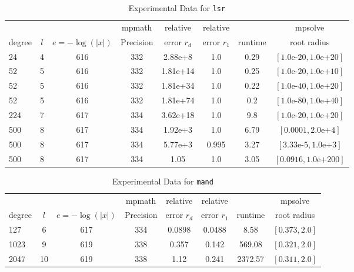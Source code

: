 \documentclass[sigconf]{acmart}
\begin{document}
\begin{table}[t]
\caption{Experimental Data for \texttt{lsr}} %
\label{tab:lsr}
\vskip -0.15in
\begin{center}
\begin{small}
\begin{sc}
\begin{tabular}{lccccccc}
\toprule
&  &  & mpmath & relative  & relative &  & mpsolve \\
degree  & $l$& $e=-\log(|x|)$& Precision &error $r_d$       & error $r_1$ &runtime& root radius\\
\midrule
 24 & 4 & 616 & 332 & 2.88e+8 & 1.0 & 0.29 & $[1.0\text{e-}20, 1.0\text{e+}20]$\\
 52 & 5 & 616 & 332 & 1.81e+14 & 1.0 & 0.25 & $[1.0\text{e-}20, 1.0\text{e+}10]$\\ %
 52 & 5 & 616 & 332 & 1.81e+34 & 1.0 & 0.22 & $[1.0\text{e-}40, 1.0\text{e+}20]$\\ %
 52 & 5 & 616 & 332 & 1.81e+74 & 1.0 & 0.2 & $[1.0\text{e-}80, 1.0\text{e+}40]$\\ %
 224 & 7 & 617 & 334 & 3.62e+18 & 1.0 & 9.8 & $[1.0\text{e-}20, 1.0\text{e+}20]$\\
 500 & 8 & 617 & 334 & 1.92e+3 & 1.0 & 6.79 & $[0.0001, 2.0\text{e+}4]$\\
 500 & 8 & 617 & 334 & 5.77e+3 & 0.995 & 3.27 & $[3.33\text{e-}5, 1.0\text{e+}3]$\\
 500 & 8 & 617 & 334 & 1.05 & 1.0 & 3.05 & $[0.0916, 1.0\text{e+}200]$\\
\bottomrule
\end{tabular}
\end{sc}
\end{small}
\end{center}
\vskip 0.05in
\end{table}


\begin{table}[t]
\caption{Experimental Data for \texttt{mand}} %
\label{tab:mand}
\vskip -0.15in
\begin{center}
\begin{small}
\begin{sc}
\begin{tabular}{lccccccc}
\toprule
&  &  & mpmath & relative  & relative &  & mpsolve \\
degree  & $l$& $e=-\log(|x|)$& Precision &error $r_d$       & error $r_1$ &runtime& root radius\\
\midrule
 127 & 6 & 617 & 334 & 0.0898 & 0.0488 & 8.58 & $[0.373, 2.0]$\\
 1023 & 9 & 619 & 338 & 0.357 & 0.142 & 569.08 & $[0.321, 2.0]$\\
 2047 & 10 & 619 & 338 & 1.12 & 0.241 & 2372.57 & $[0.311, 2.0]$\\
\bottomrule
\end{tabular}
\end{sc}
\end{small}
\end{center}
\vskip 0.05in
\end{table}
\end{document}
